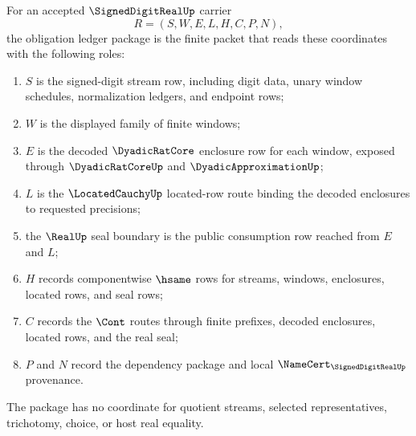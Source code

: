 \begin{definition}
\label{def:signed-digit-real-obligation-ledger-package}
For an accepted $\SignedDigitRealUp$ carrier
$$
R=(S,W,E,L,H,C,P,N),
$$
the obligation ledger package is the finite packet that reads these coordinates with the following roles:
\begin{enumerate}
\item $S$ is the signed-digit stream row, including digit data, unary window schedules, normalization ledgers, and endpoint rows;
\item $W$ is the displayed family of finite windows;
\item $E$ is the decoded $\DyadicRatCore$ enclosure row for each window, exposed through $\DyadicRatCoreUp$ and $\DyadicApproximationUp$;
\item $L$ is the $\LocatedCauchyUp$ located-row route binding the decoded enclosures to requested precisions;
\item the $\RealUp$ seal boundary is the public consumption row reached from $E$ and $L$;
\item $H$ records componentwise $\hsame$ rows for streams, windows, enclosures, located rows, and seal rows;
\item $C$ records the $\Cont$ routes through finite prefixes, decoded enclosures, located rows, and the real seal;
\item $P$ and $N$ record the dependency package and local $\NameCert_{\SignedDigitRealUp}$ provenance.
\end{enumerate}
The package has no coordinate for quotient streams, selected representatives, trichotomy, choice, or host real equality.
\end{definition}

